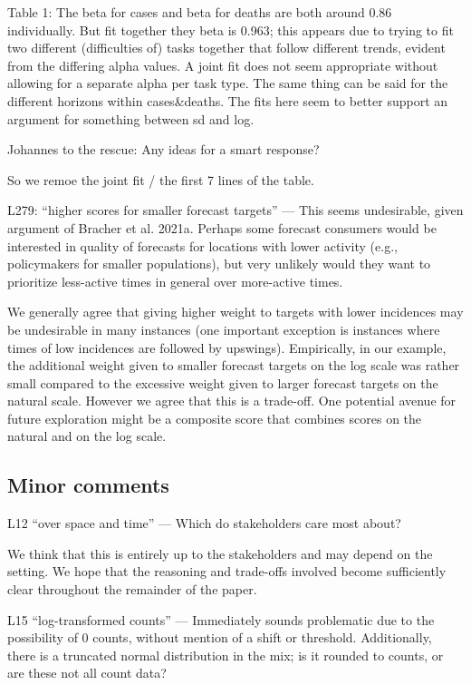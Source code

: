 \documentclass{article}
\newcommand{\red}{\color{red}}
\newcommand{\black}{\color{black}}
\newcommand{\blue}{\color{blue}}
\begin{document}
\red
Table 1: The beta for cases and beta for deaths are both around 0.86 individually. But fit together they beta is 0.963; this appears due to trying to fit two different (difficulties of) tasks together that follow different trends, evident from the differing alpha values. A joint fit does not seem appropriate without allowing for a separate alpha per task type. The same thing can be said for the different horizons within cases\&deaths. The fits here seem to better support an argument for something between sd and log.

\black
Johannes to the rescue: Any ideas for a smart response? 

So we remoe the joint fit / the first 7 lines of the table. 

\blue
L279: “higher scores for smaller forecast targets” — This seems undesirable, given argument of Bracher et al. 2021a. Perhaps some forecast consumers would be interested in quality of forecasts for locations with lower activity (e.g., policymakers for smaller populations), but very unlikely would they want to prioritize less-active times in general over more-active times.  

\black 
We generally agree that giving higher weight to targets with lower incidences may be undesirable in many instances (one important exception is instances where times of low incidences are followed by upswings). Empirically, in our example, the additional weight given to smaller forecast targets on the log scale was rather small compared to the excessive weight given to larger forecast targets on the natural scale. However we agree that this is a trade-off. One potential avenue for future exploration might be a composite score that combines scores on the natural and on the log scale. 

\subsection{Minor comments}

\blue
L12 “over space and time” — Which do stakeholders care most about?

\black
We think that this is entirely up to the stakeholders and may depend on the setting. We hope that the reasoning and trade-offs involved become sufficiently clear throughout the remainder of the paper. 

\blue
L15 “log-transformed counts” — Immediately sounds problematic due to the possibility of 0 counts, without mention of a shift or threshold. Additionally, there is a truncated normal distribution in the mix; is it rounded to counts, or are these not all count data?
\end{document}

